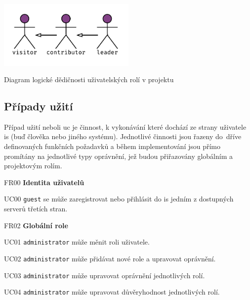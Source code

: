 \begin{fig:illustration}
   \includegraphics[width=0.5\textwidth]{images/dia-actors-project.pdf}
   \caption{Diagram logické dědičnosti uživatelských rolí v projektu}\label{pic:dia-actors-project}
\end{fig:illustration}



\subsection{Případy užití}

Případ užití neboli \gls{uc} je činnost, k vykonávání které dochází ze strany uživatele \gls{is} (buď člověka nebo jiného systému). Jednotlivé činnosti jsou řazeny do~dříve definovaných funkčních požadavků a během implementování jsou přímo promítány na jednotlivé typy oprávnění, jež budou přiřazovány globálním a projektovým rolím.


\begin{dlnar}
   \item[FR00] \textbf{Identita uživatelů}

   \begin{dlnar}
      \item[UC00]
      \texttt{guest} se může zaregistrovat nebo přihlásit do \gls{is} jedním z dostupných serverů třetích stran.
   \end{dlnar}
\end{dlnar}



\begin{dlnar}
   \item[FR02] \textbf{Globální role}

   \begin{dlnar}
      \item[UC01] 
      \texttt{administrator} může měnit roli uživatele. 

      \item[UC02] 
      \texttt{administrator} může přidávat nové role a upravovat oprávnění. 

      \item[UC03]
      \texttt{administrator} může upravovat oprávnění jednotlivých rolí.

      \item[UC04] 
      \texttt{administrator} může upravovat důvěryhodnost jednotlivých rolí.
   \end{dlnar}
\end{dlnar}


